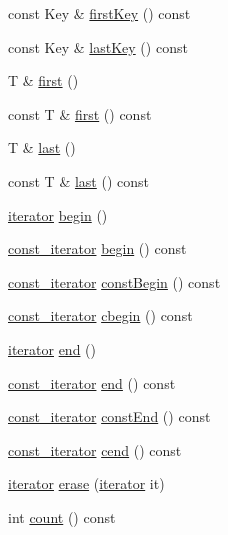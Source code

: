 \begin{DoxyCompactItemize}
\item 
const Key \& \hyperlink{class_q_map_a21b63de8c6e2acf6458e1f037447f1f1}{first\+Key} () const 
\item 
const Key \& \hyperlink{class_q_map_adf18d1ecc5ba94a47d7aed1c76a9a02e}{last\+Key} () const 
\item 
T \& \hyperlink{class_q_map_a76eff2973b6f43136f19c4ece9b26e20}{first} ()
\item 
const T \& \hyperlink{class_q_map_ada606e964f8103db2aa394f13c9739a5}{first} () const 
\item 
T \& \hyperlink{class_q_map_a15760303547971e1b447b9c101c11c8d}{last} ()
\item 
const T \& \hyperlink{class_q_map_af87415f175b4695209630b0d3f5a092b}{last} () const 
\item 
\hyperlink{class_q_map_1_1iterator}{iterator} \hyperlink{class_q_map_a5712fc69379f2b6d707a1c65391ff9ef}{begin} ()
\item 
\hyperlink{class_q_map_1_1const__iterator}{const\+\_\+iterator} \hyperlink{class_q_map_ad68737610cafc03024bd38baeaf79497}{begin} () const 
\item 
\hyperlink{class_q_map_1_1const__iterator}{const\+\_\+iterator} \hyperlink{class_q_map_ab55b01ac2790d09ceff0b911474a8b43}{const\+Begin} () const 
\item 
\hyperlink{class_q_map_1_1const__iterator}{const\+\_\+iterator} \hyperlink{class_q_map_a47aabac432ee8118f320217fd53ea32e}{cbegin} () const 
\item 
\hyperlink{class_q_map_1_1iterator}{iterator} \hyperlink{class_q_map_a2935881385191efbb074e96cf8d3c9b6}{end} ()
\item 
\hyperlink{class_q_map_1_1const__iterator}{const\+\_\+iterator} \hyperlink{class_q_map_abacc17da153723c386eb2c280460718f}{end} () const 
\item 
\hyperlink{class_q_map_1_1const__iterator}{const\+\_\+iterator} \hyperlink{class_q_map_a6307f2d58e928bb15019024150f0afcb}{const\+End} () const 
\item 
\hyperlink{class_q_map_1_1const__iterator}{const\+\_\+iterator} \hyperlink{class_q_map_a51c894aba21c16d3b778f211a43d9ee0}{cend} () const 
\item 
\hyperlink{class_q_map_1_1iterator}{iterator} \hyperlink{class_q_map_add6cad4f0b12644cfe593d95f7a75807}{erase} (\hyperlink{class_q_map_1_1iterator}{iterator} it)
\item 
int \hyperlink{class_q_map_ab80b18b6941bf11916918741a7342263}{count} () const 
\item 

\end{DoxyCompactItemize}
